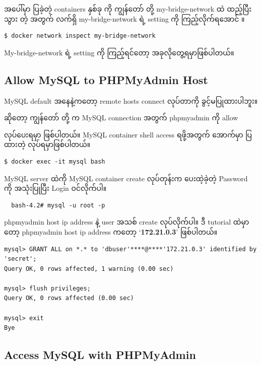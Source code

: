 \documentclass[]{article}
\begin{document}
အပေါ်မှာ ပြခဲ့တဲ့ containers နှစ်ခု ကို ကျွန်တော် တို့ my-bridge-network
ထဲ ထည့်ပြီးသွား တဲ့ အတွက် လက်ရှိ my-bridge-network ရဲ့ setting ကို
ကြည့်လိုက်ရအောင် ။

\begin{verbatim}
$ docker network inspect my-bridge-network
\end{verbatim}

My-bridge-network ရဲ့ setting ကို ကြည့်ရင်တော့ အခုလိုတွေ့ရမှာဖြစ်ပါတယ်။

\hypertarget{allow-mysql-to-phpmyadmin-host}{%
\subsection{Allow MySQL to PHPMyAdmin
Host}\label{allow-mysql-to-phpmyadmin-host}}

MySQL default အနေနဲ့ကတော့ remote hosts connect လုပ်တာကို
ခွင့်မပြုထားပါဘူး။

ဆိုတော့ ကျွန်တော် တို့ က MySQL connection အတွက် phpmyadmin ကို allow

လုပ်ပေးရမှာ ဖြစ်ပါတယ်။ MySQL container shell access ရဖို့အတွက် အောက်မှာ
ပြထားတဲ့ လုပ်ရမှာဖြစ်ပါတယ်။

\begin{verbatim}
$ docker exec -it mysql bash
\end{verbatim}

MySQL server ထဲကို MySQL container create လုပ်တုန်းက ပေးထဲ့ခဲ့တဲ့
Password ကို အသုံးပြုပြီး Login ဝင်လိုက်ပါ။

\begin{verbatim}
  bash-4.2# mysql -u root -p
\end{verbatim}

phpmyadmin host ip address နဲ့ user အသစ် create လုပ်လိုက်ပါ။ ဒီ tutorial
ထဲမှာတော့ phpmyadmin host ip address ကတော့ `\textbf{172.21.0.3}'
ဖြစ်ပါတယ်။

\begin{verbatim}
mysql> GRANT ALL on *.* to 'dbuser'****@****'172.21.0.3' identified by 'secret';
Query OK, 0 rows affected, 1 warning (0.00 sec)

mysql> flush privileges;
Query OK, 0 rows affected (0.00 sec)

mysql> exit
Bye
\end{verbatim}

\hypertarget{access-mysql-with-phpmyadmin}{%
\subsection{Access MySQL with
PHPMyAdmin}\label{access-mysql-with-phpmyadmin}}
\end{document}
